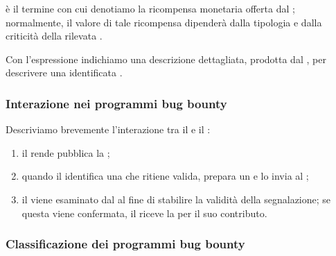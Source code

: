 \begin{definizione}[\BountyReward]
\Bountyreward è il termine con cui denotiamo la ricompensa monetaria offerta dal \BI \cite{hoffman2021bountychain}; normalmente, il valore di tale ricompensa dipenderà dalla tipologia e dalla criticità della \vulnerability rilevata \cite{canidio2021verioss}.
\end{definizione}

\begin{definizione}[\BugReport]
Con l'espressione \bugreport indichiamo una descrizione dettagliata, prodotta dal \BH, per descrivere una \vulnerability identificata \cite{hoffman2021bountychain}.
\end{definizione}

\subsubsection{Interazione nei programmi bug bounty}

Descriviamo brevemente l'interazione tra il \BI e il \BH \cite{hoffman2021bountychain}:
\begin{enumerate}


\item il \BI rende pubblica la \bugbounty;

\item quando il \BH identifica una \vulnerability che ritiene valida, prepara un \bugreport e lo invia al \BI;

\item il \bugreport viene esaminato dal \BI al fine di stabilire la validità della segnalazione; se questa viene confermata, il \BH riceve la \bountyreward per il suo contributo.

\end{enumerate}

\subsubsection{Classificazione dei programmi bug bounty}


